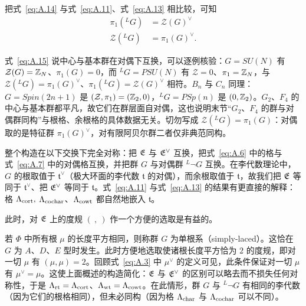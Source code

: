 把式~\eqref{eq:A.14} 与式~\eqref{eq:A.11}、式~\eqref{eq:A.13} 相比较，可知
\setcounter{equation}{14}
\begin{equation}\label{eq:A.15}
  \begin{aligned}\pi_1({}^LG)&={\mathcal Z}(G)^\vee\\
                     {\mathcal Z}({}^LG)&=\pi_1(G)^\vee.\end{aligned}
\end{equation}

\begin{yizhu}[易错点]
式~\eqref{eq:A.15} 说中心与基本群在对偶下互换，可以逐例核验：$G=SU(N)$ 有 ${\mathcal Z}(G)={\mathbb{Z}}_N$、$\pi_1(G)=0$，而 $^LG=PSU(N)$ 有 ${\mathcal Z}=0$、$\pi_1={\mathbb{Z}}_N$，与 ${\mathcal Z}({}^LG)=\pi_1(G)^\vee$、$\pi_1({}^LG)={\mathcal Z}(G)^\vee$ 相符。$B_n$ 与 $C_n$ 同理：$G=Spin(2n+1)$ 是 $({\mathcal Z},\pi_1)=({\mathbb{Z}}_2,0)$，$^LG=PSp(n)$ 是 $(0,{\mathbb{Z}}_2)$。$G_2$、$F_4$ 的中心与基本群都平凡，故它们在群层面自对偶，这也说明末节“$G_2$、$F_4$ 的群与对偶群同构”与根格、余根格的具体数据无关。切勿写成 ${\mathcal Z}({}^LG)=\pi_1(G)$：对偶取的是特征群 $\pi_1(G)^\vee$，对有限阿贝尔群二者仅非典范同构。
\end{yizhu}

整个构造在以下交换下完全对称：把 $\mathfrak{E}$ 与 $\mathfrak{E}^\vee$ 互换，把式~\eqref{eq:A.6} 中的格与式~\eqref{eq:A.7} 中的对偶格互换，并把群 $G$ 与对偶群 $^L\neg G$ 互换。在李代数理论中，$G$ 的根取值于 $\mathfrak t^\vee$（极大环面的李代数 $\mathfrak t$ 的对偶），而余根取值于 $\mathfrak t$，故我们把 $\mathfrak{E}$ 等同于 $\mathfrak t^\vee$、把 $\mathfrak{E}^\vee$ 等同于 $\mathfrak t$。式~\eqref{eq:A.11} 与式~\eqref{eq:A.13} 的结果有更直接的解释：格 $\Lambda_{\rm cort},$ $\Lambda_{\rm cochar}$、$\Lambda_{\rm cowt}$ 都自然地嵌入 $\mathfrak t$。

\bigskip{}

此时，对 $\mathfrak{E}$ 上的度规 $(~,~)$ 作一个方便的选取是有益的。

若 $\Phi$ 中所有根 $\mu$ 的长度平方相同，则称群 $G$ 为单根系（simply-laced）。这恰在 $G$ 为 $ {A}$、$ {D}$、$ {E}$ 型时发生。此时方便地选取使诸根长度平方恰为 $2$ 的度规，即对一切 $\mu$ 有 $(\mu,\mu)=2$。回顾式~\eqref{eq:A.3} 中 $\mu^\vee$ 的定义可见，此条件保证对一切 $\mu$ 有 $\mu^\vee=\mu$。这使上面概述的构造简化：$\mathfrak{E}$ 与 $\mathfrak{E}^\vee$ 的区别可以略去而不损失任何对称性，于是 $\Lambda_{\rm rt}=\Lambda_{\rm cort}$、$\Lambda_{\rm wt}=\Lambda_{\rm cowt}$。在此情形，群 $G$ 与 $^L\neg G$ 有相同的李代数（因为它们的根格相同），但未必同构（因为格 $\Lambda_{\rm char}$ 与 $\Lambda_{\rm cochar}$ 可以不同）。

